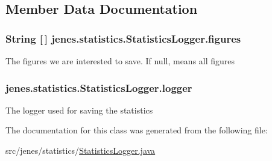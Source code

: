 \subsection{Member Data Documentation}
\hypertarget{classjenes_1_1statistics_1_1_statistics_logger_a294b6a4c271f4cbc935792d99bd284b3}{
\subsubsection[{figures}]{\setlength{\rightskip}{0pt plus 5cm}String \mbox{[}$\,$\mbox{]} jenes.\-statistics.\-Statistics\-Logger.\-figures\hspace{0.3cm}{\ttfamily [private]}}}\label{classjenes_1_1statistics_1_1_statistics_logger_a294b6a4c271f4cbc935792d99bd284b3}
The figures we are interested to save. If null, means all figures \hypertarget{classjenes_1_1statistics_1_1_statistics_logger_a8b3fff50891ab6715773b1e71dbfe30d}{
\subsubsection[{logger}]{ jenes.\-statistics.\-Statistics\-Logger.\-logger\hspace{0.3cm}{\ttfamily [private]}}}\label{classjenes_1_1statistics_1_1_statistics_logger_a8b3fff50891ab6715773b1e71dbfe30d}
The logger used for saving the statistics 

The documentation for this class was generated from the following file\-:\begin{DoxyCompactItemize}
\item 
src/jenes/statistics/\hyperlink{_statistics_logger_8java}{Statistics\-Logger.\-java}\end{DoxyCompactItemize}
